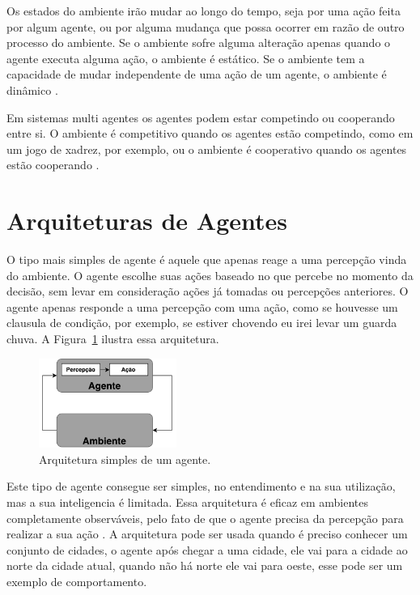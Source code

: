 Os estados do ambiente irão mudar ao longo do tempo, seja por uma ação feita por algum agente, ou por alguma mudança que possa ocorrer em razão de outro processo do ambiente. Se o ambiente sofre alguma alteração apenas quando o agente executa alguma ação, o ambiente é estático. Se o ambiente tem a capacidade de mudar independente de uma ação de um agente, o ambiente é dinâmico \cite{agent1999}.

Em sistemas multi agentes os agentes podem estar competindo ou cooperando entre si. O ambiente é competitivo quando os agentes estão competindo, como em um jogo de xadrez, por exemplo, ou o ambiente é cooperativo quando os agentes estão cooperando \cite{intelligence2003modern}.

\section{Arquiteturas de Agentes}


O tipo mais simples de agente é aquele que apenas reage a uma percepção vinda do ambiente. O agente escolhe suas ações baseado no que percebe no momento da decisão, sem levar em consideração ações já tomadas ou percepções anteriores. O agente apenas responde a uma percepção com uma ação, como se houvesse um clausula de condição, por exemplo, se estiver chovendo eu irei levar um guarda chuva. A Figura~\ref{fig:agenteSimple} ilustra essa arquitetura. 

\begin{figure}[ht]
	\centering
	\includegraphics[width=0.4\textwidth]{fig/agentSimple.pdf}
	\caption{Arquitetura simples de um agente.}
	\label{fig:agenteSimple}
\end{figure} 


Este tipo de agente consegue ser simples, no entendimento e na sua utilização, mas a sua inteligencia é limitada. Essa arquitetura é eficaz em ambientes completamente observáveis, pelo fato de que o agente precisa da percepção para realizar a sua ação \cite{intelligence2003modern}. A arquitetura pode ser usada quando é preciso conhecer um conjunto de cidades, o agente após chegar a uma cidade, ele vai para a cidade ao norte da cidade atual, quando não há norte ele vai para oeste, esse pode ser um exemplo de comportamento. 

